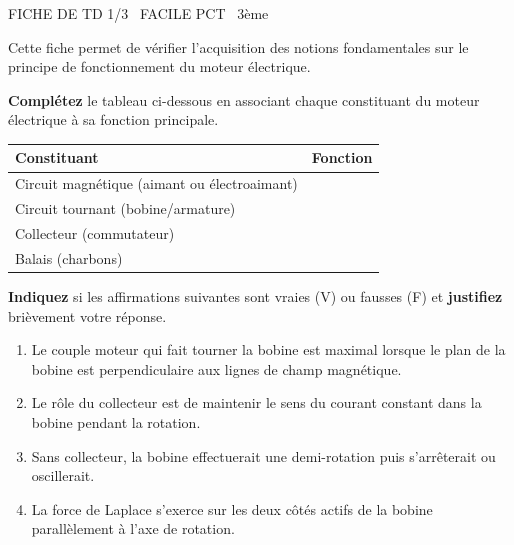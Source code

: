 \documentclass[11pt]{article}
\begin{document}
\begin{tcolorbox}[enhanced,colback=popink,colframe=popink,arc=10pt,boxrule=0pt,left=12pt,right=12pt,top=9pt,bottom=9pt]
{\color{white}\popxbold\small FICHE DE TD 1/3 \textbullet\ FACILE \hfill PCT \textbullet\ 3ème\par}
\end{tcolorbox}
\vspace{4pt}
Cette fiche permet de vérifier l'acquisition des notions fondamentales sur le principe de fonctionnement du moteur électrique.

\begin{exercice}
\textbf{Complétez} le tableau ci-dessous en associant chaque constituant du moteur électrique à sa fonction principale.
\begin{center}
\begin{tabular}{|l|p{8cm}|}
\hline
\textbf{Constituant} & \textbf{Fonction} \\ \hline
Circuit magnétique (aimant ou électroaimant) & \dotfill \\ \hline
Circuit tournant (bobine/armature) & \dotfill \\ \hline
Collecteur (commutateur) & \dotfill \\ \hline
Balais (charbons) & \dotfill \\ \hline
\end{tabular}
\end{center}
\end{exercice}

\begin{exercice}
\textbf{Indiquez} si les affirmations suivantes sont vraies (V) ou fausses (F) et \textbf{justifiez} brièvement votre réponse.
\begin{enumerate}
    \item Le couple moteur qui fait tourner la bobine est maximal lorsque le plan de la bobine est perpendiculaire aux lignes de champ magnétique.
    \item Le rôle du collecteur est de maintenir le sens du courant constant dans la bobine pendant la rotation.
    \item Sans collecteur, la bobine effectuerait une demi-rotation puis s'arrêterait ou oscillerait.
    \item La force de Laplace s'exerce sur les deux côtés actifs de la bobine parallèlement à l'axe de rotation.
\end{enumerate}
\end{exercice}
\end{document}
